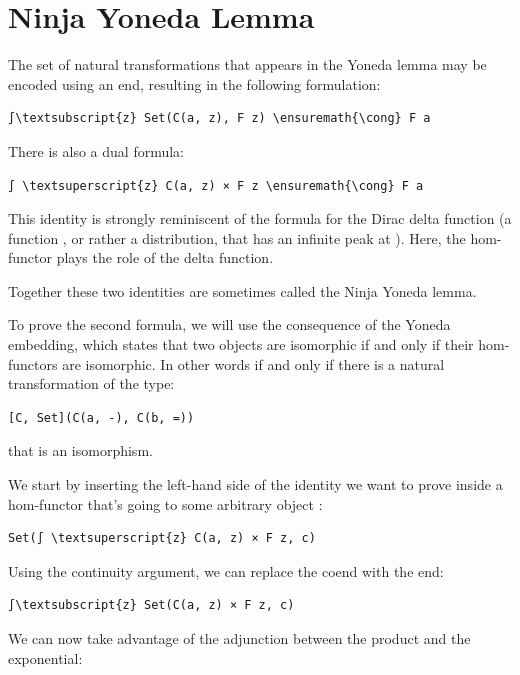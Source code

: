 \section{Ninja Yoneda Lemma}\label{ninja-yoneda-lemma}

The set of natural transformations that appears in the Yoneda lemma may
be encoded using an end, resulting in the following formulation:

\begin{Verbatim}[commandchars=\\\{\}]
∫\textsubscript{z} Set(C(a, z), F z) \ensuremath{\cong} F a
\end{Verbatim}
There is also a dual formula:

\begin{Verbatim}[commandchars=\\\{\}]
∫ \textsuperscript{z} C(a, z) × F z \ensuremath{\cong} F a
\end{Verbatim}
This identity is strongly reminiscent of the formula for the Dirac delta
function (a function , or rather a distribution, that
has an infinite peak at ). Here, the hom-functor plays
the role of the delta function.

Together these two identities are sometimes called the Ninja Yoneda
lemma.

To prove the second formula, we will use the consequence of the Yoneda
embedding, which states that two objects are isomorphic if and only if
their hom-functors are isomorphic. In other words  if
and only if there is a natural transformation of the type:

\begin{Verbatim}[commandchars=\\\{\}]
[C, Set](C(a, -), C(b, =))
\end{Verbatim}
that is an isomorphism.

We start by inserting the left-hand side of the identity we want to
prove inside a hom-functor that's going to some arbitrary object
:

\begin{Verbatim}[commandchars=\\\{\}]
Set(∫ \textsuperscript{z} C(a, z) × F z, c)
\end{Verbatim}
Using the continuity argument, we can replace the coend with the end:

\begin{Verbatim}[commandchars=\\\{\}]
∫\textsubscript{z} Set(C(a, z) × F z, c)
\end{Verbatim}
We can now take advantage of the adjunction between the product and the
exponential:

